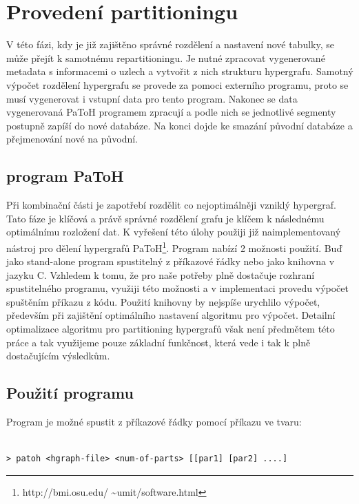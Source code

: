 \documentclass[thesis=M,czech]{FITthesis}[2012/06/26]
\begin{document}
\section{Provedení partitioningu}
V této fázi, kdy je již zajištěno správné rozdělení a nastavení nové tabulky, se může přejít k samotnému repartitioningu. Je nutné zpracovat vygenerované metadata s informacemi o uzlech a vytvořit z nich strukturu hypergrafu. Samotný výpočet rozdělení hypergrafu se provede za pomoci externího programu, proto se musí vygenerovat i vstupní data pro tento program. Nakonec se data vygenerovaná PaToH programem zpracují a podle nich se jednotlivé segmenty postupně zapíší do nové databáze. Na konci dojde ke smazání původní databáze a přejmenování nové na původní.
\subsection{program PaToH}
Při kombinační části je zapotřebí rozdělit co nejoptimálněji vzniklý hypergraf. Tato fáze je klíčová a právě správné rozdělení grafu je klíčem k následnému optimálnímu rozložení dat. K vyřešení této úlohy použiji již naimplementovaný nástroj pro dělení hypergrafů PaToH\footnote{http://bmi.osu.edu/ \textasciitilde umit/software.html}. Program nabízí 2 možnosti použití. Buď jako stand-alone program spustitelný z příkazové řádky nebo jako knihovna v jazyku C. Vzhledem k tomu, že pro naše potřeby plně dostačuje rozhraní spustitelného programu, využiji této možnosti a v implementaci provedu výpočet spuštěním příkazu z kódu. Použití knihovny by nejspíše urychlilo výpočet, především při zajištění optimálního nastavení algoritmu pro výpočet. Detailní optimalizace algoritmu pro partitioning hypergrafů však není předmětem této práce a tak využijeme pouze základní funkčnost, která vede i tak k plně dostačujícím výsledkům.

\subsection{Použití programu}
Program je možné spustit z příkazové řádky pomocí příkazu ve tvaru:
\medskip
\begin{lstlisting}[frame=single]  % Start your code-block
 
> patoh <hgraph-file> <num-of-parts> [[par1] [par2] ....]

\end{lstlisting}
\medskip
\end{document}
